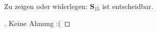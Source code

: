 Zu zeigen oder widerlegen: $\mathbf{S}_{15}$ ist entscheidbar.

\begin{proof}[\unskip\nopunct]
Keine Ahnung :(
\end{proof}
